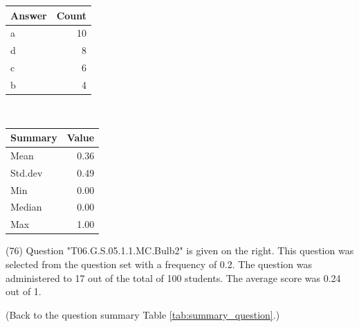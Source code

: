 \documentclass[12pt,nohyper]{tufte-handout}\usepackage[]{graphicx}\usepackage[]{color}
\begin{document}
\begin{center}%
\begin{tabular}{lr}
  \hline
Answer & Count \\ 
  \hline
a &  10 \\ 
  d &   8 \\ 
  c &   6 \\ 
  b &   4 \\ 
   \hline
\end{tabular}
~~~~~~~~%
\begin{tabular}{lr}
  \hline
Summary & Value \\ 
  \hline
Mean & 0.36 \\ 
  Std.dev & 0.49 \\ 
  Min & 0.00 \\ 
  Median & 0.00 \\ 
  Max & 1.00 \\ 
   \hline
\end{tabular}
\end{center}\newpage{} (76) Question "T06.G.S.05.1.1.MC.Bulb2" is given on the right. This question was selected from the question set with a frequency of 0.2. The question was administered to 17 out of the total of 100 students. The average score was 0.24 out of 1.

 (Back to the question summary Table \ref{tab:summary_question}.)
\end{document}
